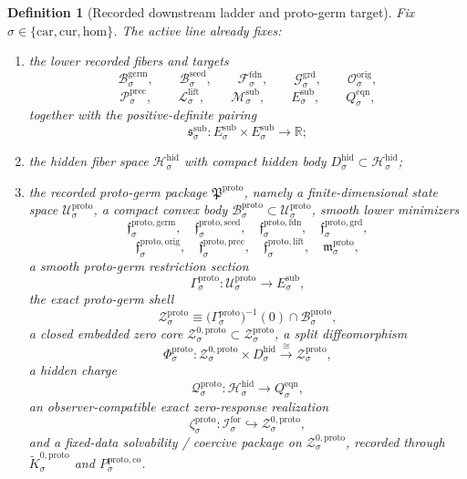 \documentclass[11pt]{article}
\newcommand{\Car}{\mathrm{car}}
\newcommand{\Cur}{\mathrm{cur}}
\newcommand{\Hom}{\mathrm{hom}}
\newcommand{\ForSpace}[1]{\mathcal I_{#1}^{\mathrm{for}}}
\newcommand{\FoundSpace}[1]{\mathcal F_{#1}^{\mathrm{fdn}}}
\newcommand{\GroundSpace}[1]{\mathcal G_{#1}^{\mathrm{grd}}}
\newcommand{\OrigSpace}[1]{\mathcal O_{#1}^{\mathrm{orig}}}
\newcommand{\PrecSpace}[1]{\mathcal P_{#1}^{\mathrm{prec}}}
\newcommand{\LiftSpace}[1]{\mathcal L_{#1}^{\mathrm{lift}}}
\newcommand{\SubSpace}[1]{\mathcal M_{#1}^{\mathrm{sub}}}
\newcommand{\SubTarget}[1]{E_{#1}^{\mathrm{sub}}}
\newcommand{\SubPair}[1]{\mathfrak s_{#1}^{\mathrm{sub}}}
\newcommand{\EqnTarget}[1]{Q_{#1}^{\mathrm{eqn}}}
\newcommand{\HiddenSpace}[1]{\mathcal H_{#1}^{\mathrm{hid}}}
\newcommand{\HiddenBody}[1]{D_{#1}^{\mathrm{hid}}}
\newcommand{\SeedBody}[1]{\mathcal B_{#1}^{\mathrm{seed}}}
\newcommand{\GermBody}[1]{\mathcal B_{#1}^{\mathrm{germ}}}
\newcommand{\ProtoPackage}{\mathfrak P^{\mathrm{proto}}}
\newcommand{\ProtoSpace}[1]{\mathcal U_{#1}^{\mathrm{proto}}}
\newcommand{\ProtoBody}[1]{\mathcal B_{#1}^{\mathrm{proto}}}
\newcommand{\ProtoGermMin}[1]{\mathfrak f_{#1}^{\mathrm{proto,germ}}}
\newcommand{\ProtoSeedMin}[1]{\mathfrak f_{#1}^{\mathrm{proto,seed}}}
\newcommand{\ProtoFoundMin}[1]{\mathfrak f_{#1}^{\mathrm{proto,fdn}}}
\newcommand{\ProtoGroundMin}[1]{\mathfrak f_{#1}^{\mathrm{proto,grd}}}
\newcommand{\ProtoOrigMin}[1]{\mathfrak f_{#1}^{\mathrm{proto,orig}}}
\newcommand{\ProtoPrecMin}[1]{\mathfrak f_{#1}^{\mathrm{proto,prec}}}
\newcommand{\ProtoLiftMin}[1]{\mathfrak f_{#1}^{\mathrm{proto,lift}}}
\newcommand{\ProtoSubMin}[1]{\mathfrak m_{#1}^{\mathrm{proto}}}
\newcommand{\ProtoSection}[1]{\Gamma_{#1}^{\mathrm{proto}}}
\newcommand{\ProtoShellSet}[1]{\mathcal Z_{#1}^{\mathrm{proto}}}
\newcommand{\ProtoZeroCore}[1]{\mathcal Z_{#1}^{0,\mathrm{proto}}}
\newcommand{\ProtoSplit}[1]{\Phi_{#1}^{\mathrm{proto}}}
\newcommand{\ProtoCharge}[1]{\mathcal Q_{#1}^{\mathrm{proto}}}
\newcommand{\ProtoEmbed}[1]{\zeta_{#1}^{\mathrm{proto}}}
\newcommand{\ProtoKernelCh}[1]{\widetilde K_{#1}^{0,\mathrm{proto}}}
\newcommand{\ProtoStateComp}[1]{P_{#1}^{\mathrm{proto,co}}}
\newtheorem{definition}{Definition}
\begin{document}
\begin{definition}[Recorded downstream ladder and proto-germ target]
\label{def:proto_target}
Fix \(\sigma\in\{\Car,\Cur,\Hom\}\). The active line already fixes:
\begin{enumerate}
    \item the lower recorded fibers and targets
    \[
    \GermBody{\sigma},\qquad
    \SeedBody{\sigma},\qquad
    \FoundSpace{\sigma},\qquad
    \GroundSpace{\sigma},\qquad
    \OrigSpace{\sigma},
    \]
    \[
    \PrecSpace{\sigma},\qquad
    \LiftSpace{\sigma},\qquad
    \SubSpace{\sigma},\qquad
    \SubTarget{\sigma},\qquad
    \EqnTarget{\sigma},
    \]
    together with the positive-definite pairing
    \[
    \SubPair{\sigma}:
    \SubTarget{\sigma}\times\SubTarget{\sigma}\to\mathbb R;
    \]
    \item the hidden fiber space \(\HiddenSpace{\sigma}\) with compact hidden body \(\HiddenBody{\sigma}\subset\HiddenSpace{\sigma}\);
    \item the recorded proto-germ package \(\ProtoPackage\), namely a finite-dimensional state space \(\ProtoSpace{\sigma}\), a compact convex body \(\ProtoBody{\sigma}\subset\ProtoSpace{\sigma}\), smooth lower minimizers
    \[
    \ProtoGermMin{\sigma},\quad
    \ProtoSeedMin{\sigma},\quad
    \ProtoFoundMin{\sigma},\quad
    \ProtoGroundMin{\sigma},
    \]
    \[
    \ProtoOrigMin{\sigma},\quad
    \ProtoPrecMin{\sigma},\quad
    \ProtoLiftMin{\sigma},\quad
    \ProtoSubMin{\sigma},
    \]
    a smooth proto-germ restriction section
    \[
    \ProtoSection{\sigma}:\ProtoSpace{\sigma}\to\SubTarget{\sigma},
    \]
    the exact proto-germ shell
    \[
    \ProtoShellSet{\sigma}
    \equiv
    \bigl(\ProtoSection{\sigma}\bigr)^{-1}(0)\cap\ProtoBody{\sigma},
    \]
    a closed embedded zero core \(\ProtoZeroCore{\sigma}\subset\ProtoShellSet{\sigma}\), a split diffeomorphism
    \[
    \ProtoSplit{\sigma}:
    \ProtoZeroCore{\sigma}\times\HiddenBody{\sigma}
    \xrightarrow{\cong}
    \ProtoShellSet{\sigma},
    \]
    a hidden charge
    \[
    \ProtoCharge{\sigma}:\HiddenSpace{\sigma}\to\EqnTarget{\sigma},
    \]
    an observer-compatible exact zero-response realization
    \[
    \ProtoEmbed{\sigma}:\ForSpace{\sigma}\hookrightarrow\ProtoZeroCore{\sigma},
    \]
    and a fixed-data solvability / coercive package on \(\ProtoZeroCore{\sigma}\), recorded through \(\ProtoKernelCh{\sigma}\) and \(\ProtoStateComp{\sigma}\).
\end{enumerate}
\end{definition}
\end{document}
